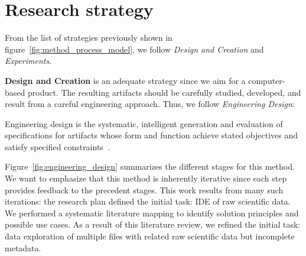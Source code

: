 \section{Research strategy}
\label{sec:method_strategy}
From the list of strategies previously shown in figure~\ref{fig:method_process_model},
we follow \emph{Design and Creation} and \emph{Experiments}.

\textbf{Design and Creation} is an adequate strategy since we aim for a
computer-based product. The resulting artifacts should be carefully studied, developed,
and result from a careful engineering approach.
Thus, we follow \emph{Engineering Design}:
    
\begin{displayquote}
  Engineering design is the systematic, intelligent generation and evaluation
  of specifications for artifacts whose form and function achieve stated
  objectives and satisfy specified constraints~\cite{Dym2012}.
\end{displayquote}

Figure~\ref{fig:engineering_design} summarizes the different stages for this method.
We want to emphasize that this method is inherently iterative since each step
provides feedback to the precedent stages. This work results from many such
iterations: the research plan defined the initial task: \gls{IDE} of raw scientific data.
We performed a systematic literature mapping to identify solution principles and possible use cases.
As a result of this literature review, we refined the initial task: data exploration of multiple files with related raw scientific data but incomplete metadata.

